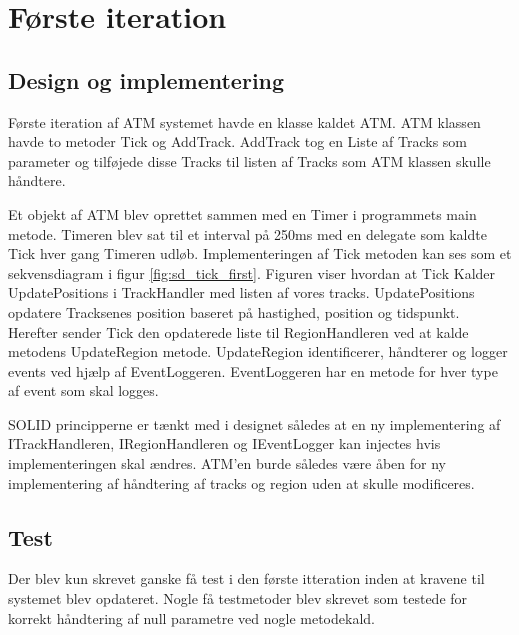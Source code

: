 \thispagestyle{fancy}
\chapter{Første iteration}
\label{chp:FirstItteration}

\section{Design og implementering}


Første iteration af ATM systemet havde en klasse kaldet ATM. ATM klassen havde to metoder Tick og AddTrack. AddTrack tog en Liste af Tracks som parameter og tilføjede disse Tracks til listen af Tracks som ATM klassen skulle håndtere. 

Et objekt af ATM blev oprettet sammen med en Timer i programmets main metode. Timeren blev sat til et interval på 250ms med en delegate som kaldte Tick hver gang Timeren udløb. Implementeringen af Tick metoden kan ses som et sekvensdiagram i figur \ref{fig:sd_tick_first}. Figuren viser hvordan at Tick Kalder UpdatePositions i TrackHandler med listen af vores tracks. UpdatePositions opdatere Tracksenes position baseret på hastighed, position og tidspunkt. Herefter sender Tick den opdaterede liste til RegionHandleren ved at kalde metodens UpdateRegion metode. UpdateRegion identificerer, håndterer og logger events ved hjælp af EventLoggeren. EventLoggeren har en metode for hver type af event som skal logges.

SOLID principperne er tænkt med i designet således at en ny implementering af ITrackHandleren, IRegionHandleren og IEventLogger kan injectes hvis implementeringen skal ændres. ATM'en burde således være åben for ny implementering af håndtering af tracks og region uden at skulle modificeres.

\section{Test}
Der blev kun skrevet ganske få test i den første itteration inden at kravene til systemet blev opdateret. Nogle få testmetoder blev skrevet som testede for korrekt håndtering af null parametre ved nogle metodekald.


